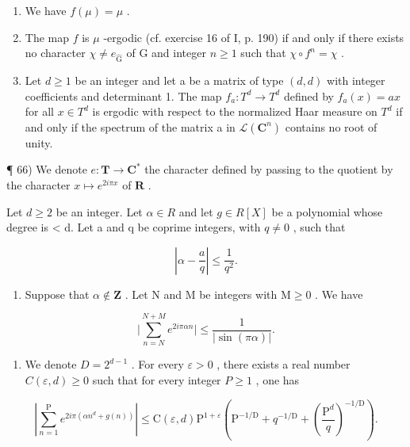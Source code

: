 \begin{enumerate}
\def\labelenumi{\alph{enumi})}
\item
  We have \(f(\mu) = \mu\) .
\item
  The map \(f\) is \(\mu\) -ergodic (cf. exercise 16 of I, p. 190) if and only if there exists no character \(\chi \neq e_{\widehat{\mathrm{G}}}\) of G and integer \(n \geqslant 1\) such that \(\chi \circ f^n = \chi\) .
\item
  Let \(d \geqslant 1\) be an integer and let a be a matrix of type \((d, d)\) with integer coefficients and determinant 1. The map \(f_{a} \colon T^{d} \to T^{d}\) defined by \(f_{a}(x) = ax\) for all \(x \in T^{d}\) is ergodic with respect to the normalized Haar measure on \(T^{d}\) if and only if the spectrum of the matrix a in \(\mathcal{L}(\mathbf{C}^{n})\) contains no root of unity.
\end{enumerate}

¶ 66) We denote \(e\colon \mathbf{T}\to \mathbf{C}^{*}\) the character defined by passing to the quotient by the character \(x\mapsto e^{2i\pi x}\) of \(\mathbf{R}\) .

Let \(d \geqslant 2\) be an integer. Let \(\alpha \in R\) and let \(g \in R[X]\) be a polynomial whose degree is \textless{} d. Let a and q be coprime integers, with \(q \neq 0\) , such that

\[
\left| \alpha - \frac {a}{q} \right| \leqslant \frac {1}{q ^ {2}}.
\]

\begin{enumerate}
\def\labelenumi{\alph{enumi})}
\tightlist
\item
  Suppose that \(\alpha \notin \mathbf{Z}\) . Let N and M be integers with \(\mathrm{M} \geqslant 0\) . We have
\end{enumerate}

\[
\Big | \sum_ {n = N} ^ {N + M} e ^ {2 i \pi \alpha n} \Big | \leqslant \frac {1}{| \sin (\pi \alpha) |}.
\]

\begin{enumerate}
\def\labelenumi{\alph{enumi})}
\setcounter{enumi}{1}
\tightlist
\item
  We denote \(D = 2^{d-1}\) . For every \(\varepsilon > 0\) , there exists a real number \(C(\varepsilon, d) \geqslant 0\) such that for every integer \(P \geqslant 1\) , one has
\end{enumerate}

\[
\left| \sum_ {n = 1} ^ {\mathrm{P}} e ^ {2 i \pi (\alpha n ^ {d} + g (n))} \right| \leqslant \mathrm{C} (\varepsilon , d) \mathrm{P} ^ {1 + \varepsilon} \left(\mathrm{P} ^ {- 1 / \mathrm{D}} + q ^ {- 1 / \mathrm{D}} + \left(\frac {\mathrm{P} ^ {d}}{q}\right) ^ {- 1 / \mathrm{D}}\right).
\]

